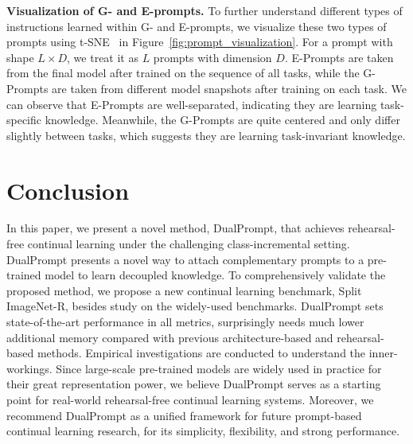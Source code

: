 \documentclass[runningheads]{llncs}
\newcommand{\method}{DualPrompt\xspace}
\newcommand{\gprompt}{G-Prompt\xspace}
\newcommand{\eprompt}{E-Prompt\xspace}
\begin{document}
\textbf{Visualization of G- and E-prompts.} To further understand different types of instructions learned within G- and E-prompts, we visualize these two types of prompts using t-SNE~\cite{van2008visualizing} in Figure~\ref{fig:prompt_visualization}. For a prompt with shape $L\times D$, we treat it as $L$ prompts with dimension $D$. \eprompt{s} are taken from the final model after trained on the sequence of all tasks, while the \gprompt{s} are taken from different model snapshots after training on each task. We can observe that \eprompt{s} are well-separated, indicating they are learning task-specific knowledge. Meanwhile, the \gprompt{s} are quite centered and only differ slightly between tasks, which suggests they are learning task-invariant knowledge. 

\section{Conclusion}
In this paper, we present a novel method, \method, that achieves rehearsal-free continual learning under the challenging class-incremental setting. %
\method presents a novel way to attach complementary prompts to a pre-trained model to learn decoupled knowledge. To comprehensively validate the proposed method, we propose a new continual learning benchmark, Split ImageNet-R, besides study on the widely-used benchmarks.
\method sets state-of-the-art performance in all metrics, surprisingly needs much lower additional memory compared with previous architecture-based and rehearsal-based methods. Empirical investigations are conducted to understand the inner-workings.
Since large-scale pre-trained models are widely used in practice for their great representation power, we believe \method serves as a starting point for real-world rehearsal-free continual learning systems. Moreover, we recommend \method as a unified framework for future prompt-based continual learning research, for its simplicity, flexibility, and strong performance.
\end{document}
